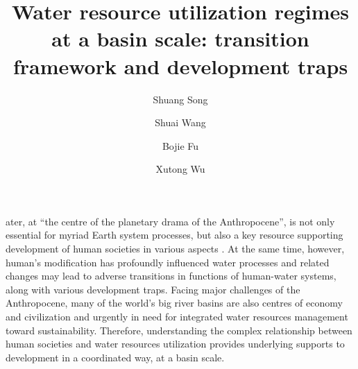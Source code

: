 \documentclass[9pt, twocolumn, twoside, lineno]{pnas-new}
\title{Water resource utilization regimes at a basin scale: transition framework and development traps}
\author[a, b]{Shuang Song}  %
\author[a, b, 1]{Shuai Wang}  %
\author[a, b]{Bojie Fu}  %
\author[c, d]{Xutong Wu}  %
\affil[a]{ %
	State Key Laboratory of Earth Surface Processes and Resource Ecology, 
	Faculty of Geographical Science, 
	Beijing Normal University, 
	Beijing 100875, 
	P.R. China
}
\affil[b]{ %
	Institute of Land Surface System and Sustainability, 
	Faculty of Geographical Science, 
	Beijing Normal University, 
	Beijing 100875, 
	P.R. China
}
\affil[c]{ %
	College of Urban and Environmental Sciences, 
	Peking University, 
	Beijing 100871, 
	P.R. China
}
\affil[d]{ %
	State Key Laboratory of Urban and Regional Ecology, 
	Research Center for Eco-Environmental Sciences, 
	Chinese Academy of Sciences, 
	Beijing 100085, 
	P.R. China 
}
\begin{document}
\maketitle
\thispagestyle{firststyle}


ater, at “the centre of the planetary drama of the Anthropocene”, 
is not only essential for myriad Earth system processes,
but also a key resource supporting development of human societies in various aspects \cite{gleesonIlluminatingWaterCycle2020}.
At the same time, however, human's modification has profoundly influenced water processes 
and related changes may lead to adverse transitions in functions of human-water systems,
along with various development traps. 
Facing major challenges of the Anthropocene, many of the world's big river basins are also centres of economy and civilization 
and urgently in need for integrated water resources management toward sustainability. \cite{bestAnthropogenicStressesWorld2019}
Therefore, understanding the complex relationship between human societies and water resources utilization 
provides underlying supports to development in a coordinated way, at a basin scale.
\end{document}
